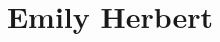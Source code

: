 \documentclass[letterpaper,10pt,oneside]{article}
\newcommand{\CVAuthor}{Emily Herbert}
\begin{document}
\title{\CVAuthor}
\end{document}
